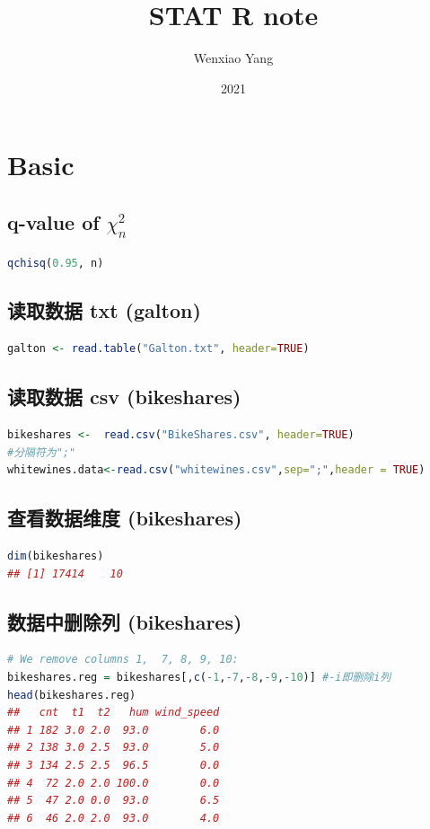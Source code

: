 \documentclass[11pt,a4paper]{article}
\title{STAT R note}
\author[*]{Wenxiao Yang}
\affil[*]{Department of Mathematics, University of Illinois at Urbana-Champaign}
\date{2021}
\begin{document}
\maketitle
\tableofcontents
\newpage

\section{Basic}
\subsection{q-value of $\chi^2_n$}
\begin{lstlisting}[language=R]
qchisq(0.95, n)
\end{lstlisting}
\subsection{读取数据 txt (galton)}
\begin{lstlisting}[language=R]
galton <- read.table("Galton.txt", header=TRUE)
\end{lstlisting}
\subsection{读取数据 csv (bikeshares)}
\begin{lstlisting}[language=R]
bikeshares <-  read.csv("BikeShares.csv", header=TRUE)
#分隔符为";"
whitewines.data<-read.csv("whitewines.csv",sep=";",header = TRUE)
\end{lstlisting}
\subsection{查看数据维度 (bikeshares)}
\begin{lstlisting}[language=R]
dim(bikeshares)
## [1] 17414    10
\end{lstlisting}

\subsection{数据中删除列 (bikeshares)}
\begin{lstlisting}[language=R]
# We remove columns 1,  7, 8, 9, 10:
bikeshares.reg = bikeshares[,c(-1,-7,-8,-9,-10)] #-i即删除i列
head(bikeshares.reg)
##   cnt  t1  t2   hum wind_speed
## 1 182 3.0 2.0  93.0        6.0
## 2 138 3.0 2.5  93.0        5.0
## 3 134 2.5 2.5  96.5        0.0
## 4  72 2.0 2.0 100.0        0.0
## 5  47 2.0 0.0  93.0        6.5
## 6  46 2.0 2.0  93.0        4.0
\end{lstlisting}
\end{document}
